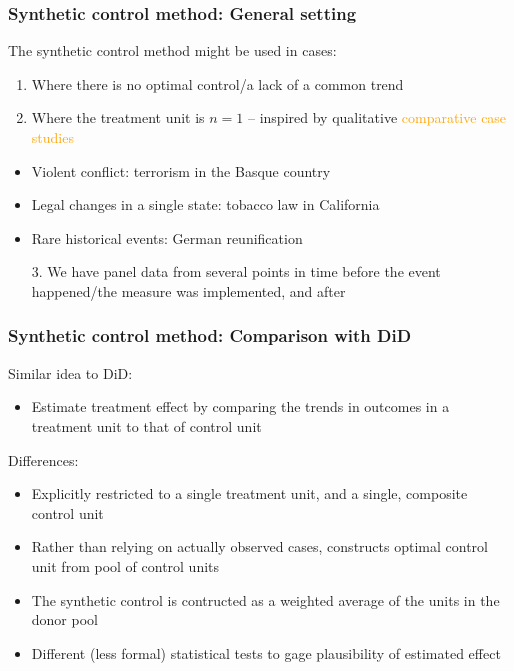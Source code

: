 \documentclass[12pt,english,dvipsnames,aspectratio=169,handout]{beamer}\usepackage[]{graphicx}\usepackage[]{xcolor}
\begin{document}
\begin{frame}
  \frametitle{Synthetic control method: General setting}
\footnotesize

The synthetic control method might be used in cases:
\begin{enumerate}
  \item Where there is no optimal control/a lack of a common trend
  \item Where the treatment unit is $n=1$ -- inspired by qualitative \textcolor{orange}{comparative case studies} \vspace{-3mm}
\end{enumerate}
    \begin{itemize} \scriptsize
      \item Violent conflict: terrorism in the Basque country \cite{abadie_economic_2003}
      \item Legal changes in a single state: tobacco law in California \cite{abadie_synthetic_2010}
      \item Rare historical events: German reunification \cite{abadie_comparative_2015}
    \end{itemize} \vspace{-3mm}
\begin{enumerate} \footnotesize
  \item[3.] We have panel data from several points in time before the event happened/the measure was implemented, and after 
  \end{enumerate}
\end{frame}




\begin{frame}
  \frametitle{Synthetic control method: Comparison with DiD}
\footnotesize
Similar idea to DiD: 
\begin{itemize} 
  \item Estimate treatment effect by comparing the trends in outcomes in a treatment unit to that of control unit
\end{itemize}
Differences:
\begin{itemize} 
  \item Explicitly restricted to a single treatment unit, and a single, composite control unit
  \item Rather than relying on actually observed cases, constructs optimal control unit from pool of control units
  \item The synthetic control is contructed as a weighted average of the units in the donor pool 
  \item Different (less formal) statistical tests to gage plausibility of estimated effect
\end{itemize} 
\end{frame}
\end{document}
